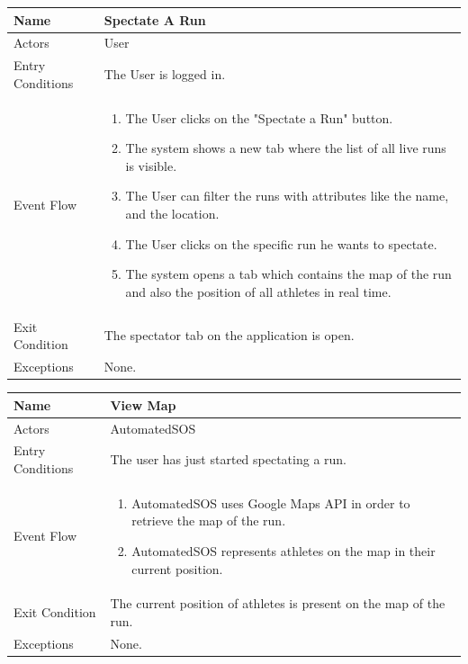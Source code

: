 \begin{enumerate}
\FloatBarrier
\begin{table}[h]
\begin{tabular}{|l|p{}|}
\hline
Name             & Spectate A Run \\ \hline
Actors           & User  \\ \hline
Entry Conditions & The User is logged in.    \\ \hline
Event Flow       & \begin{enumerate}
            \item The User clicks on the "Spectate a Run" button.
            \item The system shows a new tab where the list of all live runs is visible.
            \item The User can filter the runs with attributes like the name, and the location.
            \item The User clicks on the specific run he wants to spectate.
            \item The system opens a tab which contains the map of the run and also the position of all athletes in real time.
        \end{enumerate}\\ \hline
Exit Condition   & The spectator tab on the application is open.\\ \hline
Exceptions       & None.\\ \hline
\end{tabular}
\end{table}
\FloatBarrier

\FloatBarrier
\begin{table}[h]
\begin{tabular}{|l|p{}|}
\hline
Name             & View Map \\ \hline
Actors           & AutomatedSOS  \\ \hline
Entry Conditions & The user has just started spectating a run. \\ \hline
Event Flow       & \begin{enumerate}
            \item AutomatedSOS uses Google Maps API in order to retrieve the map of the run.
            \item AutomatedSOS represents athletes on the map in their current position.
        \end{enumerate}\\ \hline
Exit Condition   & The current position of athletes is present on the map of the run.\\ \hline
Exceptions       & None.\\ \hline
\end{tabular}
\end{table}
\FloatBarrier

\end{enumerate}


